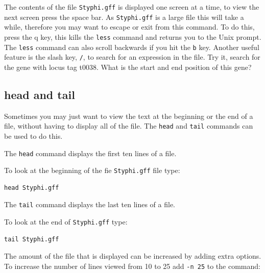 \documentclass[11pt]{article}
\makeatletter
\newcommand{\boxspacing}{\kern\kvtcb@left@rule\kern\kvtcb@boxsep}
\newcommand{\prompt}[4]{
        {\ttfamily\llap{{\color{blue}\LARGE\faKeyboardO\hspace{3pt}#4}}\vspace{-\baselineskip}}
    }
\makeatother
\begin{document}
    The contents of the file \texttt{Styphi.gff} is displayed one screen at
a time, to view the next screen press the space bar. As
\texttt{Styphi.gff} is a large file this will take a while, therefore
you may want to escape or exit from this command. To do this, press the
q key, this kills the \texttt{less} command and returns you to the Unix
prompt. The \texttt{less} command can also scroll backwards if you hit
the \texttt{b} key. Another useful feature is the slash key, \texttt{/},
to search for an expression in the file. Try it, search for the gene
with locus tag t0038. What is the start and end position of this gene?

    \hypertarget{head-and-tail}{%
\subsection{head and tail}\label{head-and-tail}}

Sometimes you may just want to view the text at the beginning or the end
of a file, without having to display all of the file. The \texttt{head}
and \texttt{tail} commands can be used to do this.

    The \texttt{head} command displays the first ten lines of a file.

To look at the beginning of the fie \texttt{Styphi.gff} file type:

    \begin{tcolorbox}[breakable, size=fbox, boxrule=1pt, pad at break*=1mm,colback=cellbackground, colframe=cellborder]
\prompt{In}{incolor}{ }{\boxspacing}
\begin{Verbatim}[commandchars=\\\{\}]
head Styphi.gff
\end{Verbatim}
\end{tcolorbox}

    The \texttt{tail} command displays the last ten lines of a file.

To look at the end of \texttt{Styphi.gff} type:

    \begin{tcolorbox}[breakable, size=fbox, boxrule=1pt, pad at break*=1mm,colback=cellbackground, colframe=cellborder]
\prompt{In}{incolor}{ }{\boxspacing}
\begin{Verbatim}[commandchars=\\\{\}]
tail Styphi.gff
\end{Verbatim}
\end{tcolorbox}

    The amount of the file that is displayed can be increased by adding
extra options. To increase the number of lines viewed from 10 to 25 add
\texttt{-n\ 25} to the command:
\end{document}
